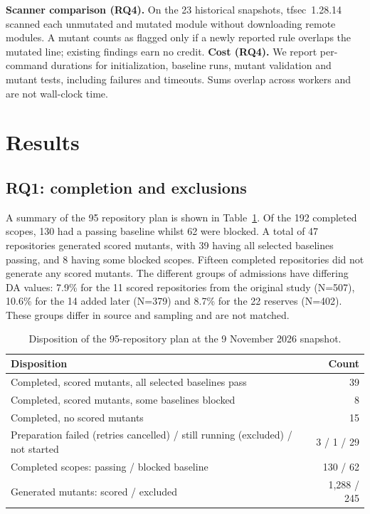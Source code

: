 \documentclass[3p,times,procedia]{elsarticle}
\begin{document}
\textbf{Scanner comparison (RQ4).} On the 23 historical snapshots, tfsec~1.28.14~\cite{tfsec} scanned each unmutated and mutated module without downloading remote modules. A mutant counts as flagged only if a newly reported rule overlaps the mutated line; existing findings earn no credit. \textbf{Cost (RQ4).} We report per-command durations for initialization, baseline runs, mutant validation and mutant tests, including failures and timeouts. Sums overlap across workers and are not wall-clock time.

\section{Results}\label{sec:results}
\subsection{RQ1: completion and exclusions}\label{sec:completion}
A summary of the 95 repository plan is shown in Table~\ref{tab:overview}. Of the 192 completed scopes, 130 had a passing baseline whilst 62 were blocked. A total of 47 repositories generated scored mutants, with 39 having all selected baselines passing, and 8 having some blocked scopes. Fifteen completed repositories did not generate any scored mutants. The different groups of admissions have differing DA values: 7.9\% for the 11 scored repositories from the original study (N=507), 10.6\% for the 14 added later (N=379) and 8.7\% for the 22 reserves (N=402). These groups differ in source and sampling and are not matched.


\begin{table}[ht]
\caption{Disposition of the 95-repository plan at the 9 November 2026 snapshot.}\label{tab:overview}
\small\begin{tabularx}{\linewidth}{@{}Xr@{}}\toprule
Disposition & Count\\\midrule
Completed, scored mutants, all selected baselines pass & 39\\
Completed, scored mutants, some baselines blocked & 8\\
Completed, no scored mutants & 15\\
Preparation failed (retries cancelled) / still running (excluded) / not started & 3 / 1 / 29\\
Completed scopes: passing / blocked baseline & 130 / 62\\
Generated mutants: scored / excluded & 1,288 / 245\\\bottomrule
\end{tabularx}\end{table}
\end{document}
